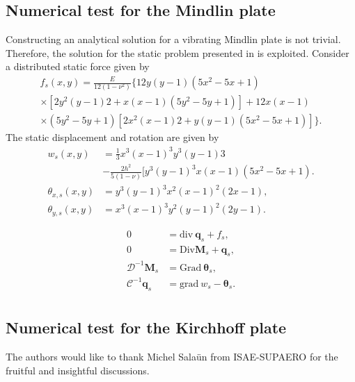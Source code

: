 \documentclass{ifacconf}
\begin{document}
\subsection{Numerical test for the Mindlin plate}
Constructing an analytical solution for a vibrating Mindlin plate is not trivial. Therefore, the solution for the static problem presented in \cite{mindlinVeiga} is exploited. Consider a distributed static force given by 
\begin{equation*}
\begin{aligned}
f_s(x,y)=\frac{E}{12 (1-\nu^2)} \{12 y(y-1)(5x^2-5x+1)\\
\times [2y^2(y-1)2+x(x-1)(5y^2-5y+1)] +12x(x-1)\\
\times (5y^2-5y+1)[2x^2(x-1)2+y(y-1)(5x^2-5x+1)]\}.
\end{aligned}
\end{equation*}
The static displacement and rotation are given by
\begin{align*}
	w_s(x,y) &= \frac{1}{3} x^3(x-1)^3 y^3 (y-1)3\\
	&-\frac{2 h^2}{5(1-\nu)}[y^3(y-1)^3 x(x-1)(5 x^2-5x+1). \\
	\theta_{x, s}(x,y) &= y^3(y-1)^3 x^2 (x-1)^2 (2x-1), \\
	\theta_{y, s}(x,y) &= x^3(x-1)^3 y^2 (y-1)^2 (2y-1).
\end{align*}

\begin{equation}
\begin{aligned}
0 &= \mathrm{div} \ \bm{q}_s + f_s , \\
0 &= \mathrm{Div} \bm{M}_s + \bm{q}_s, \\
\mathcal{D}^{-1} \bm{M}_s &= \mathrm{Grad} \ \bm{\theta}_s, \\
\mathcal{C}^{-1} \bm{q}_s &= \mathrm{grad} \ w_s - \bm{\theta}_s. \\
\end{aligned}
\end{equation}

 
\subsection{Numerical test for the Kirchhoff plate}

\begin{ack}
The authors would like to thank Michel Sala\"un from ISAE-SUPAERO for the fruitful and insightful discussions.
\end{ack}

                                                   
\end{document}
